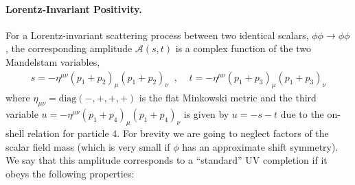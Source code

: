 \documentclass[11pt]{article}
\begin{document}
\paragraph{Lorentz-Invariant Positivity.}
For a Lorentz-invariant scattering process between two identical scalars, $\phi \phi \to \phi \phi$, the corresponding amplitude $\mathcal{A} (s,t)$ is a complex function of the two Mandelstam variables,
\begin{align}
 s = - \eta^{\mu\nu} ( p_1 + p_2 )_\mu (p_1 + p_2 )_\nu \;\; , \;\;\;\; t = - \eta^{\mu\nu} (p_1 + p_3 )_\mu (p_1 + p_3 )_\nu
 \label{eqn:Mand}
\end{align}
where $\eta_{\mu\nu} = \text{diag} ( -, + , + , + )$ is the flat Minkowski metric and the third variable $u = -\eta^{\mu\nu} ( p_1 + p_4 )_\mu (p_1 + p_4 )_\nu $ is given by $u = -s -t$ due to the on-shell relation for particle 4. For brevity we are going to neglect factors of the scalar field mass (which is very small if $\phi$ has an approximate shift symmetry).
We say that this amplitude corresponds to a ``standard'' UV completion if it obeys the following properties:
\end{document}
